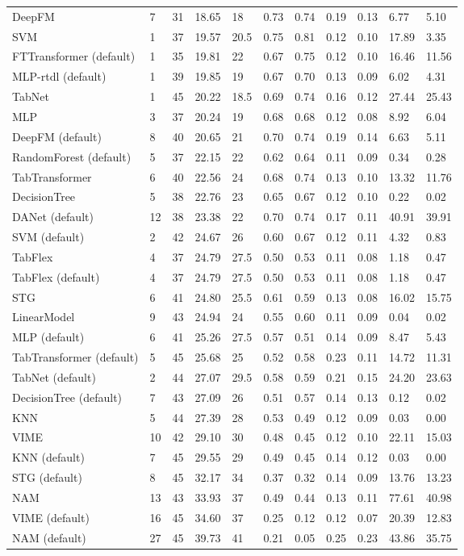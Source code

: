 \begin{tabular}{lllllllllll}
DeepFM & 7 & 31 & 18.65 & 18 & 0.73 & 0.74 & 0.19 & 0.13 & 6.77 & 5.10 \\
SVM & 1 & 37 & 19.57 & 20.5 & 0.75 & 0.81 & 0.12 & 0.10 & 17.89 & 3.35 \\
FTTransformer (default) & 1 & 35 & 19.81 & 22 & 0.67 & 0.75 & 0.12 & 0.10 & 16.46 & 11.56 \\
MLP-rtdl (default) & 1 & 39 & 19.85 & 19 & 0.67 & 0.70 & 0.13 & 0.09 & 6.02 & 4.31 \\
TabNet & 1 & 45 & 20.22 & 18.5 & 0.69 & 0.74 & 0.16 & 0.12 & 27.44 & 25.43 \\
MLP & 3 & 37 & 20.24 & 19 & 0.68 & 0.68 & 0.12 & 0.08 & 8.92 & 6.04 \\
DeepFM (default) & 8 & 40 & 20.65 & 21 & 0.70 & 0.74 & 0.19 & 0.14 & 6.63 & 5.11 \\
RandomForest (default) & 5 & 37 & 22.15 & 22 & 0.62 & 0.64 & 0.11 & 0.09 & 0.34 & 0.28 \\
TabTransformer & 6 & 40 & 22.56 & 24 & 0.68 & 0.74 & 0.13 & 0.10 & 13.32 & 11.76 \\
DecisionTree & 5 & 38 & 22.76 & 23 & 0.65 & 0.67 & 0.12 & 0.10 & 0.22 & 0.02 \\
DANet (default) & 12 & 38 & 23.38 & 22 & 0.70 & 0.74 & 0.17 & 0.11 & 40.91 & 39.91 \\
SVM (default) & 2 & 42 & 24.67 & 26 & 0.60 & 0.67 & 0.12 & 0.11 & 4.32 & 0.83 \\
TabFlex & 4 & 37 & 24.79 & 27.5 & 0.50 & 0.53 & 0.11 & 0.08 & 1.18 & 0.47 \\
TabFlex (default) & 4 & 37 & 24.79 & 27.5 & 0.50 & 0.53 & 0.11 & 0.08 & 1.18 & 0.47 \\
STG & 6 & 41 & 24.80 & 25.5 & 0.61 & 0.59 & 0.13 & 0.08 & 16.02 & 15.75 \\
LinearModel & 9 & 43 & 24.94 & 24 & 0.55 & 0.60 & 0.11 & 0.09 & 0.04 & 0.02 \\
MLP (default) & 6 & 41 & 25.26 & 27.5 & 0.57 & 0.51 & 0.14 & 0.09 & 8.47 & 5.43 \\
TabTransformer (default) & 5 & 45 & 25.68 & 25 & 0.52 & 0.58 & 0.23 & 0.11 & 14.72 & 11.31 \\
TabNet (default) & 2 & 44 & 27.07 & 29.5 & 0.58 & 0.59 & 0.21 & 0.15 & 24.20 & 23.63 \\
DecisionTree (default) & 7 & 43 & 27.09 & 26 & 0.51 & 0.57 & 0.14 & 0.13 & 0.12 & 0.02 \\
KNN & 5 & 44 & 27.39 & 28 & 0.53 & 0.49 & 0.12 & 0.09 & 0.03 & 0.00 \\
VIME & 10 & 42 & 29.10 & 30 & 0.48 & 0.45 & 0.12 & 0.10 & 22.11 & 15.03 \\
KNN (default) & 7 & 45 & 29.55 & 29 & 0.49 & 0.45 & 0.14 & 0.12 & 0.03 & 0.00 \\
STG (default) & 8 & 45 & 32.17 & 34 & 0.37 & 0.32 & 0.14 & 0.09 & 13.76 & 13.23 \\
NAM & 13 & 43 & 33.93 & 37 & 0.49 & 0.44 & 0.13 & 0.11 & 77.61 & 40.98 \\
VIME (default) & 16 & 45 & 34.60 & 37 & 0.25 & 0.12 & 0.12 & 0.07 & 20.39 & 12.83 \\
NAM (default) & 27 & 45 & 39.73 & 41 & 0.21 & 0.05 & 0.25 & 0.23 & 43.86 & 35.75 \\
\bottomrule
\end{tabular}

